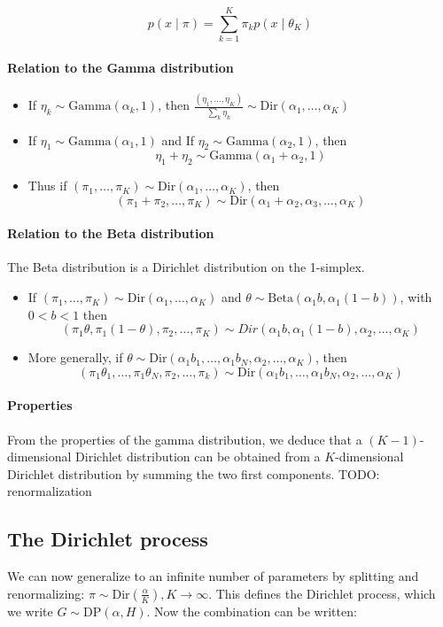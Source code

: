 \documentclass[twoside]{article}
\newcommand{\Dir}{\mathrm{Dir}}
\newcommand{\Gam}{\mathrm{Gamma}}
\newcommand{\Bet}{\mathrm{Beta}}
\newcommand{\DP}{\mathrm{DP}}
\newcommand{\todo}[1]{{\color{red} TODO: #1}}
\begin{document}
$$ p(x \mid \pi) = \sum_{k=1}^K \pi_k p(x \mid \theta_K) $$

\paragraph{Relation to the Gamma distribution}

\begin{itemize}
\item If $\eta_k \sim \Gam(\alpha_k, 1)$, then $\frac{(\eta_1,\ldots,\eta_K)}{\sum_k \eta_k} \sim \Dir(\alpha_1,\ldots,\alpha_K)$
\item If $\eta_1 \sim \Gam(\alpha_1, 1)$ and If $\eta_2 \sim \Gam(\alpha_2, 1)$, then
\[ \eta_1 +\eta_2 \sim \Gam(\alpha_1 + \alpha_2, 1) \]
\item Thus if $(\pi_1,\ldots,\pi_K) \sim \Dir(\alpha_1,\ldots,\alpha_K)$, then
\[ (\pi_1 + \pi_2,\ldots,\pi_K) \sim \Dir(\alpha_1 + \alpha_2, \alpha_3,\ldots,\alpha_K) \]
\end{itemize}

\paragraph{Relation to the Beta distribution}
The Beta distribution is a Dirichlet distribution on the 1-simplex.
\begin{itemize}
\item If $(\pi_1,\ldots,\pi_K) \sim \Dir(\alpha_1,\ldots,\alpha_K)$ and $\theta \sim \Bet{(\alpha_1b,\alpha_1(1-b))}$, with $0 < b < 1$ then
\[ (\pi_1\theta,\pi_1(1-\theta),\pi_2,\ldots,\pi_K) \sim Dir{(\alpha_1 b,\alpha_1(1-b),\alpha_2,\ldots,\alpha_K)} \]
\item More generally, if $\theta \sim \Dir{(\alpha_1b_1,\ldots,\alpha_1b_N,\alpha_2,\ldots,\alpha_K)}$, then
\[ (\pi_1\theta_1,\ldots,\pi_1\theta_N,\pi_2,\ldots,\pi_k) \sim \Dir{(\alpha_1b_1,\ldots,\alpha_1b_N,\alpha_2,\ldots,\alpha_K)} \]
\end{itemize}


\paragraph{Properties}

From the properties of the gamma distribution, we deduce that a $(K-1)$-dimensional Dirichlet distribution can be obtained from a $K$-dimensional Dirichlet distribution by summing the two first components.
\todo{renormalization}

\subsection{The Dirichlet process}
We can now generalize to an infinite number of parameters by splitting and renormalizing: $\pi \sim \Dir(\frac{\alpha}{K}), K \longrightarrow \infty$. This defines the Dirichlet process, which we write $G \sim \DP(\alpha, H)$. Now the combination can be written:
\end{document}
